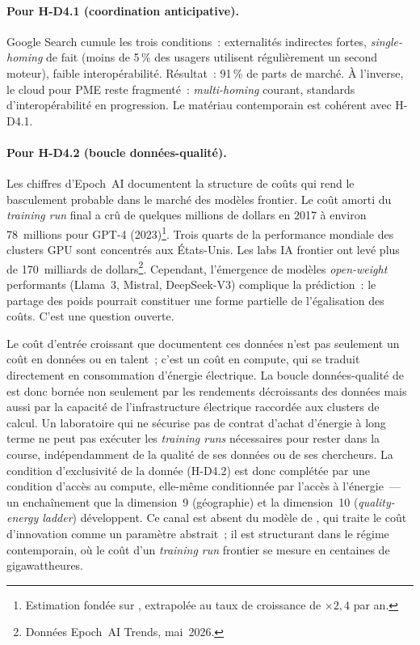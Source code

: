 \paragraph{Pour H-D4.1 (coordination anticipative).} Google Search cumule les trois conditions~: externalités indirectes fortes, \emph{single-homing} de fait (moins de 5\,\% des usagers utilisent régulièrement un second moteur), faible interopérabilité. Résultat~: 91\,\% de parts de marché. À l'inverse, le cloud pour PME reste fragmenté~: \emph{multi-homing} courant, standards d'interopérabilité en progression. Le matériau contemporain est cohérent avec H-D4.1.

\paragraph{Pour H-D4.2 (boucle données-qualité).} Les chiffres d'Epoch~AI documentent la structure de coûts qui rend le basculement probable dans le marché des modèles frontier. Le coût amorti du \emph{training run} final a crû de quelques millions de dollars en 2017 à environ 78~millions pour GPT-4 (2023)\footnote{Estimation fondée sur \textcite{cottier_rising_2024}, extrapolée au taux de croissance de $\times 2{,}4$ par an.}. Trois quarts de la performance mondiale des clusters GPU sont concentrés aux États-Unis. Les labs IA frontier ont levé plus de 170~milliards de dollars\footnote{Données Epoch~AI Trends, mai~2026.}. Cependant, l'émergence de modèles \emph{open-weight} performants (Llama~3, Mistral, DeepSeek-V3) complique la prédiction~: le partage des poids pourrait constituer une forme partielle de l'égalisation des coûts. C'est une question ouverte.

Le coût d'entrée croissant que documentent ces données n'est pas seulement un coût en données ou en talent~; c'est un coût en compute, qui se traduit directement en consommation d'énergie électrique. La boucle données-qualité de \textcite{pruefer_competing_2021} est donc bornée non seulement par les rendements décroissants des données \parencite{farboodi_data_2022} mais aussi par la capacité de l'infrastructure électrique raccordée aux clusters de calcul. Un laboratoire qui ne sécurise pas de contrat d'achat d'énergie à long terme ne peut pas exécuter les \emph{training runs} nécessaires pour rester dans la course, indépendamment de la qualité de ses données ou de ses chercheurs. La condition d'exclusivité de la donnée (H-D4.2) est donc complétée par une condition d'accès au compute, elle-même conditionnée par l'accès à l'énergie~--- un enchaînement que la dimension~9 (géographie) et la dimension~10 (\emph{quality-energy ladder}) développent. Ce canal est absent du modèle de \textcite{pruefer_competing_2021}, qui traite le coût d'innovation comme un paramètre abstrait~; il est structurant dans le régime contemporain, où le coût d'un \emph{training run} frontier se mesure en centaines de gigawattheures.

